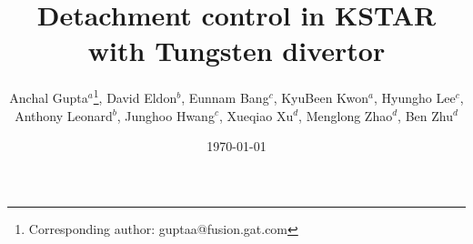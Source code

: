\documentclass[10pt]{iopart}
\begin{document}
\title{Detachment control in KSTAR with Tungsten divertor}

\author{
    Anchal Gupta$^a$\footnote{Corresponding author: guptaa@fusion.gat.com},
    David Eldon$^b$, 
    Eunnam Bang$^c$, 
    KyuBeen Kwon$^a$, 
    Hyungho Lee$^c$, 
    Anthony Leonard$^b$, 
    Junghoo Hwang$^c$, 
    Xueqiao Xu$^d$, 
    Menglong Zhao$^d$, 
    Ben Zhu$^d$
}

\address{$^a$\ORAU}
\address{$^b$\GA}
\address{$^c$\KFE}
\address{$^d$\LLNL}

\date{\today}



\submitto{\PPCF}

\maketitle

\ioptwocol

\acresetall  %




















\end{document}
